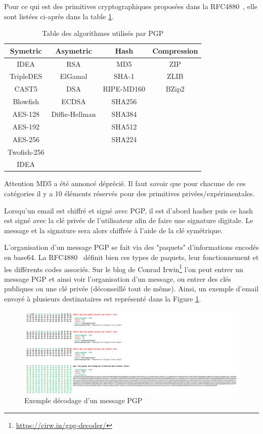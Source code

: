 Pour ce qui est des primitives cryptographiques proposées dans la RFC4880~\cite{RFC4880}, elle sont listées ci-après dans la table \ref{table:refPGPAlgos}.

\begin{table}[h!]
	\centering
	\begin{tabular}{||c c c c||}
		\hline
		Symetric & Asymetric & Hash & Compression \\ [0.5ex]
		\hline\hline
		IDEA & RSA & MD5 & ZIP \\
		TripleDES & ElGamal & SHA-1 & ZLIB \\
		CAST5 & DSA & RIPE-MD160 & BZip2 \\
		Blowfish & ECDSA & SHA256 & \\
		AES-128 & Diffie-Hellman & SHA384 & \\
		AES-192 & & SHA512 & \\
		AES-256 & & SHA224 & \\
		Twofish-256 & & & \\
		IDEA & & & \\
		\hline
	\end{tabular}
\caption{Table des algorithmes utilisés par PGP}
\label{table:refPGPAlgos}
\end{table}

Attention MD5 a été annoncé déprécié. Il faut savoir que pour chacune de ces catégories il y a 10 éléments réservés pour des primitives privées/expérimentales.

Lorsqu'un email est chiffré et signé avec PGP, il est d'abord hasher puis ce hash est signé avec la clé privée de l'utilisateur afin de faire une signature digitale. Le message et la signature sera alors chiffrée à l'aide de la clé symétrique.

L'organisation d'un message PGP se fait via des "paquets" d'informations encodés en base64. La RFC4880~\cite{RFC4880} définit bien ces types de paquets, leur fonctionnement et les différents codes associés. Sur le blog de Conrad Irwin\footnote{\url{https://cirw.in/gpg-decoder/}} l'on peut entrer un message PGP et ainsi voir l'organisation d'un message, ou entrer des clés publiques ou une clé privée (déconseillé tout de même). Ainsi, un exemple d'email envoyé à plusieurs destinataires est représenté dans la Figure \ref{fig:PGP_DECODE}. 

\begin{figure}[h!]
	\includegraphics[width=\textwidth]{images/examplePGPDecode.png}
	\centering
	\caption{Exemple décodage d'un message PGP}
	\label{fig:PGP_DECODE}
\end{figure}

